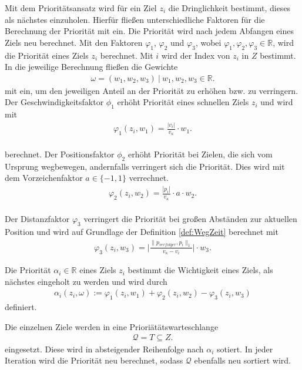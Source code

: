 \documentclass[german,version-2019-11]{uzl-thesis}
\begin{document}
Mit dem Prioritätsansatz wird für ein Ziel $z_i$ die Dringlichkeit bestimmt, dieses als nächstes einzuholen. Hierfür fließen unterschiedliche Faktoren für die Berechnung der Priorität mit ein. Die Priorität wird nach jedem Abfangen eines Ziels neu berechnet. Mit den Faktoren $\varphi_1$, $\varphi_2$ und $\varphi_3$, wobei $\varphi_1,\varphi_2,\varphi_3\in\mathbb{R}$, wird die Priorität eines Ziels $z_i$ berechnet. Mit $i$ wird der Index von $z_i$ in $Z$ bestimmt.  In die jeweilige Berechnung fließen die Gewichte
\begin{align*}
\omega = (w_1, w_2 ,w_3)~|~w_1,w_2,w_3\in\mathbb{R}.
\end{align*}
mit ein, um den jeweiligen Anteil an der Priorität zu erhöhen bzw. zu verringern.\\
Der Geschwindigkeitsfaktor $\phi_1$ erhöht Priorität eines schnellen Ziels $z_i$ und wird mit 
\begin{align}
\varphi_1(z_i, w_1) = \frac{|v_i|}{v_{\kappa}}\cdot w_1.
\end{align}\\
berechnet.
\label{def:FaktorPos}
Der Positionsfaktor $\phi_2$ erhöht Priorität bei Zielen, die sich vom Ursprung wegbewegen, andernfalls verringert sich die Priorität. Dies wird mit dem Vorzeichenfaktor $a\in\{-1,1\}$ verrechnet.
\begin{align}
\varphi_2(z_i, w_2) = \frac{|p_i|}{v_{\kappa}}\cdot a \cdot w_2.
\end{align}\\
Der Distanzfaktor $\varphi_3$ verringert die Priorität bei großen Abständen zur aktuellen Position und wird auf Grundlage der Definition \ref{def:WegZeit} berechnet mit
\begin{align}
\varphi_3(z_i, w_3) = \bigg\vert\frac{\|p_{verfolger},p_i\|_1}{v_{\kappa}-v_i}\bigg\vert \cdot w_3.
\end{align}
\begin{definition}
Die Priorität $\alpha_i\in\mathbb{R}$ eines Ziels $z_i$ bestimmt die Wichtigkeit eines Ziels, als nächstes eingeholt zu werden und wird durch
\begin{align*}
\alpha_i(z_i, \omega) := \varphi_1(z_i,w_1) + \varphi_2(z_i,w_2) - \varphi_3(z_i,w_3)
\end{align*}
definiert.
\end{definition}\noindent
Die einzelnen Ziele werden in eine Prioriätätswarteschlange
\begin{align*}
\mathcal{Q} = T\subseteq Z.
\end{align*}
eingesetzt. Diese wird in absteigender Reihenfolge nach $\alpha_i$ sotiert. In jeder Iteration wird die Priorität neu berechnet, sodass $\mathcal{Q}$ ebenfalls neu sortiert wird.
\end{document}
